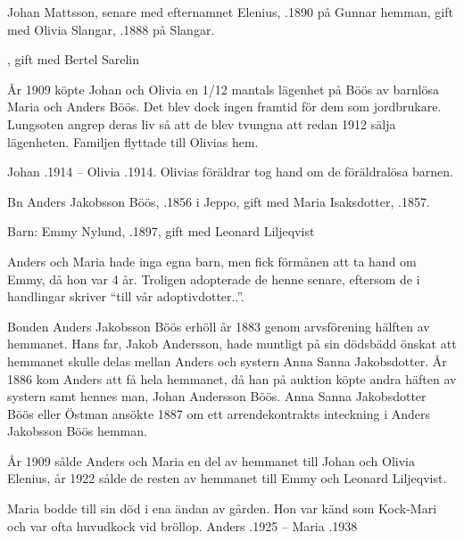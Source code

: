Johan Mattsson, senare med efternamnet Elenius,  .1890 på Gunnar hemman, gift med Olivia Slangar, .1888 på Slangar.
\begin{jhchildren}
  \item {}
  \item {}, gift med Bertel Sarelin
\end{jhchildren}
År 1909 köpte Johan och Olivia en 1/12 mantals lägenhet på Böös av barnlösa Maria och Anders Böös. Det blev dock ingen framtid för dem som jordbrukare. Lungsoten angrep deras liv så att de blev tvungna att redan 1912 sälja lägenheten. Familjen flyttade till Olivias hem.

Johan .1914  --  Olivia .1914. Olivias föräldrar tog hand om de föräldralösa barnen.


Bn Anders Jakobsson Böös, .1856 i Jeppo, gift med  Maria Isaksdotter, .1857.

Barn: Emmy Nylund, .1897, gift med Leonard Liljeqvist

Anders och Maria hade inga egna barn, men fick förmånen att ta hand om Emmy, då hon var 4 år. Troligen adopterade de henne senare, eftersom de i handlingar skriver ``till vår adoptivdotter..''.

Bonden Anders Jakobsson Böös erhöll år 1883 genom arvsförening hälften av  hemmanet. Hans far, Jakob Andersson, hade muntligt på sin dödsbädd önskat att hemmanet skulle delas mellan Anders och systern Anna Sanna Jakobsdotter. År 1886 kom Anders att få hela hemmanet, då han på auktion köpte andra häften av systern samt hennes man, Johan Andersson Böös. Anna Sanna Jakobsdotter Böös eller Östman ansökte 1887 om ett arrendekontrakts inteckning i Anders Jakobsson Böös hemman.

År 1909 sålde Anders och Maria en del av hemmanet till Johan och Olivia Elenius, år 1922 sålde de resten av hemmanet till Emmy och Leonard Liljeqvist.

Maria bodde till sin död i ena ändan av gården. Hon var känd som Kock-Mari och var ofta huvudkock vid bröllop.
Anders .1925  --  Maria .1938


